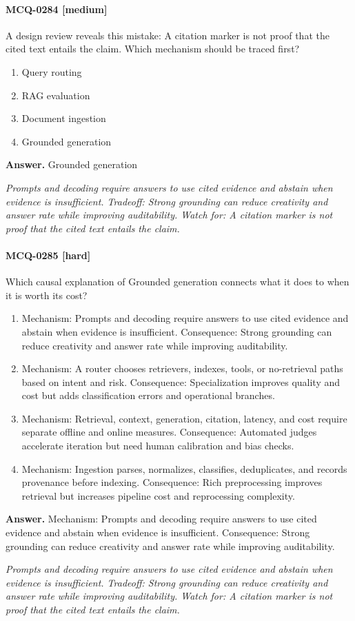 \paragraph{MCQ-0284 [medium]} A design review reveals this mistake: A citation marker is not proof that the cited text entails the claim. Which mechanism should be traced first?
\begin{enumerate}[label=\Alph*.]
\item Query routing
\item RAG evaluation
\item Document ingestion
\item Grounded generation
\end{enumerate}
\noindent\textbf{Answer.} Grounded generation
\par\textit{Prompts and decoding require answers to use cited evidence and abstain when evidence is insufficient. Tradeoff: Strong grounding can reduce creativity and answer rate while improving auditability. Watch for: A citation marker is not proof that the cited text entails the claim.}
\paragraph{MCQ-0285 [hard]} Which causal explanation of Grounded generation connects what it does to when it is worth its cost?
\begin{enumerate}[label=\Alph*.]
\item Mechanism: Prompts and decoding require answers to use cited evidence and abstain when evidence is insufficient. Consequence: Strong grounding can reduce creativity and answer rate while improving auditability.
\item Mechanism: A router chooses retrievers, indexes, tools, or no-retrieval paths based on intent and risk. Consequence: Specialization improves quality and cost but adds classification errors and operational branches.
\item Mechanism: Retrieval, context, generation, citation, latency, and cost require separate offline and online measures. Consequence: Automated judges accelerate iteration but need human calibration and bias checks.
\item Mechanism: Ingestion parses, normalizes, classifies, deduplicates, and records provenance before indexing. Consequence: Rich preprocessing improves retrieval but increases pipeline cost and reprocessing complexity.
\end{enumerate}
\noindent\textbf{Answer.} Mechanism: Prompts and decoding require answers to use cited evidence and abstain when evidence is insufficient. Consequence: Strong grounding can reduce creativity and answer rate while improving auditability.
\par\textit{Prompts and decoding require answers to use cited evidence and abstain when evidence is insufficient. Tradeoff: Strong grounding can reduce creativity and answer rate while improving auditability. Watch for: A citation marker is not proof that the cited text entails the claim.}
